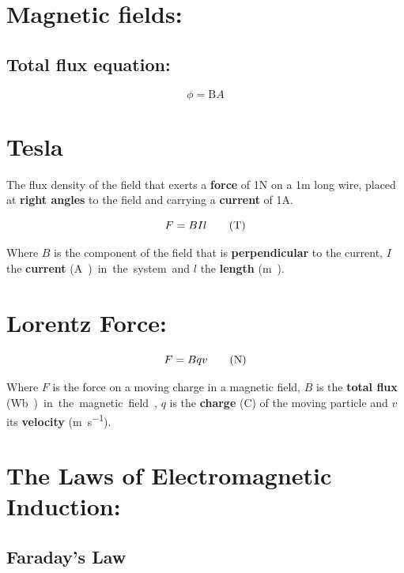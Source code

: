 \documentclass[11pt]{article}
\begin{document}
                          
\section{Magnetic fields: }
\subsection{Total flux equation: }
\begin{equation}
	\phi = \mathrm{B}A\tag{\si\weber}
\end{equation}


  \section{Tesla}
  \begin{center}
  The flux density of the field that exerts a \textbf{force} of 1\si{\newton} on a 1\si{\meter} long wire, placed at \textbf{right angles} to the field and carrying a \textbf{current} of 1\si{\ampere}.
  \end{center}
\begin{equation}
	F=BIl\tag{\si{\tesla}}
\end{equation}
\begin{center}
	Where $B$ is the component of the field that is \textbf{perpendicular} to the current, $I$ the \textbf{current} (\si\ampere) in the system and $l$ the \textbf{length} (\si\meter).
\end{center}
\section{Lorentz Force: }
\begin{equation}
	F=Bqv\tag{\si{\newton}}
\end{equation}
\begin{center}
	Where $F$ is the force on a moving charge in a magnetic field, $B$ is the \textbf{total flux} (\si\weber) in the magnetic field, $q$ is the \textbf{charge} (\si{\coulomb}) of the moving particle and $v$ its \textbf{velocity} (\si{\meter\per\second}).
\end{center}

\section{The Laws of Electromagnetic Induction: }

\subsection{Faraday's Law}
\end{document}

